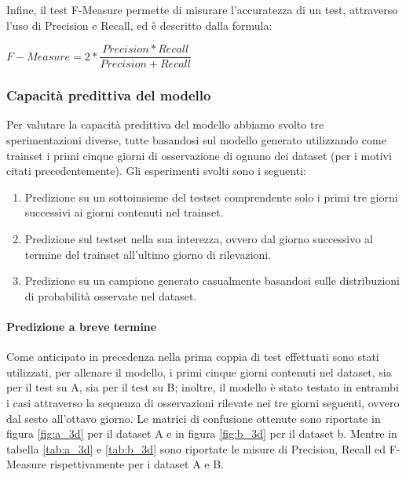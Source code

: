 \documentclass[10pt,a4paper]{article}
\begin{document}
	Infine, il test F-Measure permette di misurare l'accuratezza di un test, attraverso l'uso di Precision e Recall, ed è descritto dalla formula:

		\begin{center}
		$ F-Measure = 2 * \dfrac{Precision * Recall}{Precision + Recall} $
	\end{center}



	\subsubsection{Capacità predittiva del modello}

	Per valutare la capacità predittiva del modello abbiamo svolto tre sperimentazioni diverse, tutte basandosi sul modello generato utilizzando come trainset i primi cinque giorni di osservazione di ognuno dei dataset (per i motivi citati precedentemente). Gli esperimenti svolti sono i seguenti:
	\begin{enumerate}
	    \item Predizione su un sottoinsieme del testset comprendente solo i primi tre giorni successivi ai giorni contenuti nel trainset.
	    \item Predizione sul testset nella sua interezza, ovvero dal giorno successivo al termine del trainset all'ultimo giorno di rilevazioni.
	    \item Predizione su un campione generato casualmente basandosi sulle distribuzioni di probabilità osservate nel dataset.
	\end{enumerate}

	\paragraph{Predizione a breve termine}

	Come anticipato in precedenza nella prima coppia di test effettuati sono stati utilizzati, per allenare il modello, i primi cinque giorni contenuti nel dataset, sia per il test su A, sia per il test su B; inoltre, il modello è stato testato in entrambi i casi attraverso la sequenza di osservazioni rilevate nei tre giorni seguenti, ovvero dal sesto all'ottavo giorno. Le matrici di confusione ottenute sono riportate in figura \ref{fig:a_3d} per il dataset A e in figura \ref{fig:b_3d} per il dataset b. Mentre in tabella \ref{tab:a_3d} e \ref{tab:b_3d} sono riportate le misure di Precision, Recall ed F-Measure rispettivamente per i dataset A e B.
\end{document}
